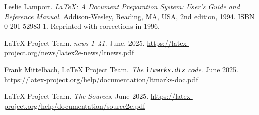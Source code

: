 \documentclass{ltnews}
\begin{document}

\begin{thebibliography}{9}\frenchspacing


Leslie Lamport.
\newblock \emph{{\LaTeX}: {A} Document Preparation System: User's Guide and Reference
  Manual}.
\newblock \mbox{Addison}-Wesley, Reading, MA, USA, 2nd edition, 1994.
\newblock ISBN 0-201-52983-1.
\newblock Reprinted with corrections in 1996.

 \LaTeX{} Project Team.
  \emph{\LaTeXe{} news 1--41}. June, 2025.
  \url{https://latex-project.org/news/latex2e-news/ltnews.pdf}

 Frank Mittelbach, \LaTeX{} Project Team.
  \emph{The \texttt{ltmarks.dtx} code}. June 2025.
  \url{https://latex-project.org/help/documentation/ltmarks-doc.pdf}

 \LaTeX{} Project Team.
  \emph{The \LaTeXe{} Sources}. June 2025.
  \url{https://latex-project.org/help/documentation/source2e.pdf}

\end{thebibliography}
\end{document}
